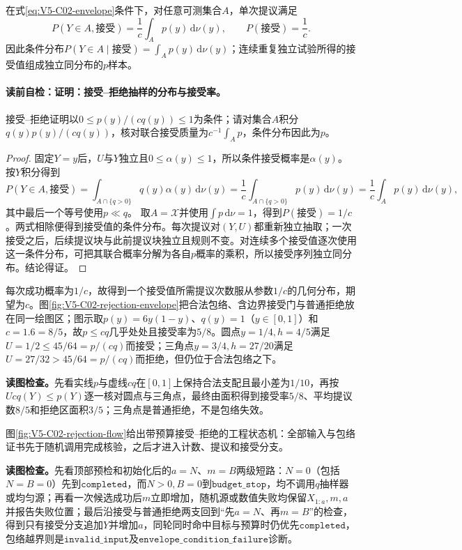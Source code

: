\begin{theorem}[接受--拒绝抽样的分布与接受率]\label{thm:V5-C02-rejection-correctness}
在式\eqref{eq:V5-C02-envelope}条件下，对任意可测集合$A$，单次提议满足
\[
P(Y\in A,\text{接受})=\frac1c\int_Ap(y)\,\mathrm d\nu(y),
\qquad P(\text{接受})=\frac1c.
\]
因此条件分布$P(Y\in A\mid\text{接受})=\int_Ap(y)\,\mathrm d\nu(y)$；连续重复独立试验所得的接受值组成独立同分布的$p$样本。
\end{theorem}
\paragraph{读前自检：证明：接受--拒绝抽样的分布与接受率。}接受--拒绝证明以$0\le p(y)/(cq(y))\le1$为条件；请对集合$A$积分$q(y)p(y)/(cq(y))$，核对联合接受质量为$c^{-1}\int_Ap$，条件分布因此为$p$。\par

\begin{proof}
固定$Y=y$后，$U$与$Y$独立且$0\le\alpha(y)\le1$，所以条件接受概率是$\alpha(y)$。按$Y$积分得到
\[
P(Y\in A,\text{接受})
=\int_{A\cap\{q>0\}}q(y)\alpha(y)\,\mathrm d\nu(y)
=\frac1c\int_{A\cap\{q>0\}}p(y)\,\mathrm d\nu(y)
=\frac1c\int_Ap(y)\,\mathrm d\nu(y),
\]
其中最后一个等号使用$p\ll q$。
取$A=\mathcal X$并使用$\int p\,\mathrm d\nu=1$，得到$P(\text{接受})=1/c$。两式相除便得到接受值的条件分布。每次提议对$(Y,U)$都重新独立抽取；一次接受之后，后续提议块与此前提议块独立且规则不变。对连续多个接受值逐次使用这一条件分布，可把其联合概率分解为各自$p$概率的乘积，所以接受序列独立同分布。结论得证。
\end{proof}
每次成功概率为$1/c$，故得到一个接受值所需提议次数服从参数$1/c$的几何分布，期望为$c$。图\ref{fig:V5-C02-rejection-envelope}把合法包络、含边界接受门与普通拒绝放在同一绘图区；图示取$p(y)=6y(1-y)$、$q(y)=1$（$y\in[0,1]$）和$c=1.6=8/5$，故$p\le cq$几乎处处且接受率为$5/8$。圆点$y=1/4,h=4/5$满足$U=1/2\le45/64=p/(cq)$而接受；三角点$y=3/4,h=27/20$满足$U=27/32>45/64=p/(cq)$而拒绝，但仍位于合法包络之下。

\FloatBarrier
\noindent\textbf{读图检查。}先看实线$p$与虚线$cq$在$[0,1]$上保持合法支配且最小差为$1/10$，再按$Ucq(Y)\le p(Y)$逐一核对圆点与三角点，最终由面积得到接受率$5/8$、平均提议数$8/5$和拒绝区面积$3/5$；三角点是普通拒绝，不是包络失效。

图\ref{fig:V5-C02-rejection-flow}给出带预算接受--拒绝的工程状态机：全部输入与包络证书先于随机调用完成核验，之后才进入计数、提议和接受分支。
\clearpage

\FloatBarrier
\noindent\textbf{读图检查。}先看顶部预检和初始化后的$a=N$、$m=B$两级短路：$N=0$（包括$N=B=0$）先到$\mathtt{completed}$，而$N>0,B=0$到$\mathtt{budget\_stop}$，均不调用$q$抽样器或均匀源；再看一次候选成功后$m$立即增加，随机源或数值失败均保留$X_{1:a},m,a$并报告失败位置；最后沿接受与普通拒绝两支回到“先$a=N$、再$m=B$”的检查，得到只有接受分支追加$Y$并增加$a$，同轮同时命中目标与预算时仍优先$\mathtt{completed}$，包络越界则是$\mathtt{invalid\_input}$及$\mathtt{envelope\_condition\_failure}$诊断。

